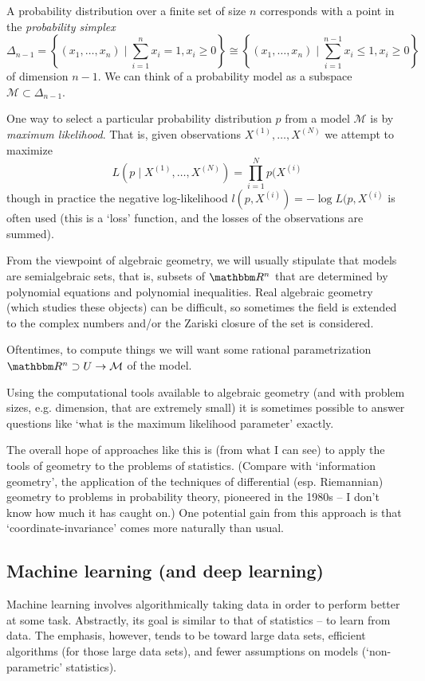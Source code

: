 \documentclass[12pt]{article}
\newcommand*{\Mod}{\mathcal{M}}
\begin{document}
A probability distribution over a finite set of size $n$ corresponds with a
point in the \emph{probability simplex}
\[
    \Delta_{n-1} = 
    \left\{(x_1, \ldots, x_{n}) \mid \sum_{i=1}^n x_i= 1, x_i \ge 0 \right\} 
    \cong 
    \left\{(x_1, \ldots, x_n) \mid \sum_{i=1}^{n-1} x_i \le 1, x_i \ge 0 \right\}
\]
of dimension $n-1$.  We can think of a probability model as a subspace 
$\Mod \subset \Delta_{n-1}$.

One way to select a particular probability distribution $p$ from a model $\Mod$
is by \emph{maximum likelihood}.  That is, given observations $X^{(1)}, \ldots,
X^{(N)}$ we attempt to maximize
\[
    L(p \mid X^{(1)}, \ldots, X^{(N)}) = \prod_{i=1}^N p(X^{(i)}
\]
though in practice the negative log-likelihood $l(p, X^{(i)}) = -\log L(p, X^{(i)}$ is
often used (this is a `loss' function, and the losses of the observations are
summed).

From the viewpoint of algebraic geometry, we will usually stipulate that models
are semialgebraic sets, that is, subsets of $\R^n$ that are determined by
polynomial equations and polynomial inequalities.  Real algebraic geometry
(which studies these objects) can be difficult, so sometimes the field is
extended to the complex numbers and/or the Zariski closure of the set is
considered.

Oftentimes, to compute things we will want some rational parametrization $\R^n
\supset U \to \Mod$ of the model.

Using the computational tools available to algebraic geometry (and with problem
sizes, e.g. dimension, that are extremely small) it is sometimes possible to
answer questions like `what is the maximum likelihood parameter' exactly.

The overall hope of approaches like this is (from what I can see) to apply the
tools of geometry to the problems of statistics.  (Compare with `information
geometry', the application of the techniques of differential (esp. Riemannian)
geometry to problems in probability theory, pioneered in the 1980s -- I don't
know how much it has caught on.)  One potential gain from this approach is that
`coordinate-invariance' comes more naturally than usual.


\subsection{Machine learning (and deep learning)}

Machine learning involves algorithmically taking data in order to perform better
at some task.  Abstractly, its goal is similar to that of statistics -- to learn
from data.  The emphasis, however, tends to be toward large data sets, efficient
algorithms (for those large data sets), and fewer assumptions on models
(`non-parametric' statistics).  
\end{document}
